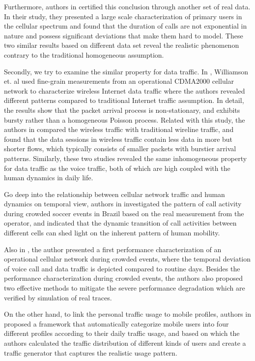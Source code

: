 {Furthermore, authors in \cite{willkomm2008primary} certified this conclusion through another set of real data. In their study, they presented a large scale characterization of primary users in the cellular spectrum and found that the duration of calls are not exponential in nature and possess significant deviations that make them hard to model. These two similar results based on different data set reveal the realistic phenomenon contrary to the traditional homogeneous assumption. 

Secondly, we try to examine the similar property for data traffic. In \cite{williamson2005characterization}, Williamson et. al used fine-grain measurements from an operational CDMA2000 cellular network to characterize wireless Internet data traffic where the authors revealed different patterns compared to traditional Internet traffic assumption. In detail, the results show that the packet arrival process is non-stationary, and exhibits bursty rather than a homogeneous Poisson process. Related with this study, the authors in \cite{zhang2012understanding} compared the wireless traffic with traditional wireline traffic, and found that the data sessions in wireless traffic contain less data in more but shorter flows, which typically consists of smaller packets with burstier arrival patterns. Similarly, these two studies revealed the same inhomogeneous property for data traffic as the voice traffic, both of which are high coupled with the human dynamics in daily life.

Go deep into the relationship between cellular network traffic and human dynamics on temporal view, authors in \cite{xavier2012analyzing} investigated the pattern of call activity during crowded soccer events in Brazil based on the real measurement from the operator, and indicated that the dynamic transition of call activities between different cells can shed light on the inherent pattern of human mobility.

Also in \cite{shafiq2013crowd}, the author presented a first performance characterization of an operational cellular network during crowded events, where the temporal deviation of voice call and data traffic is depicted compared to routine days. Besides the performance characterization during crowded events, the authors also proposed two effective methods to mitigate the severe performance degradation which are verified by simulation of real traces. 

On the other hand, to link the personal traffic usage to mobile profiles, authors in \cite{oliveira2015measurement} proposed a framework that automatically categorize mobile users into four different profiles according to their daily traffic usage, and based on which the authors calculated the traffic distribution of different kinds of users and create a traffic generator that captures the realistic usage pattern.

}
